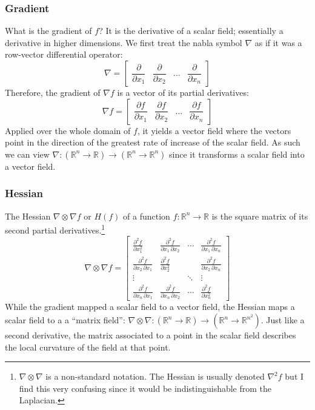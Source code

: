 \documentclass{article}
\begin{document}
\subsubsection{Gradient}
What is the gradient of $f$? It is the derivative of a scalar field; essentially
a derivative in higher dimensions. We first treat the nabla symbol $\nabla$ as
if it was a row-vector differential operator: 
\[
\nabla = 
\begin{bmatrix}
    \dfrac{\partial }{\partial x_1} &
    \dfrac{\partial }{\partial x_2} &
    \hdots &
    \dfrac{\partial }{\partial x_n}
\end{bmatrix}
\]
Therefore, the gradient of $\nabla f$ is a vector of its partial derivatives:
\[
\nabla f = 
\begin{bmatrix}
    \dfrac{\partial f}{\partial x_1} &
    \dfrac{\partial f}{\partial x_2} &
    \hdots &
    \dfrac{\partial f}{\partial x_n}
\end{bmatrix}
\]
Applied over the whole domain of $f$, it yields a vector field where the vectors
point in the direction of the greatest rate of increase of the scalar field. As
such we can view $\nabla : (\mathbb{R}^n \rightarrow \mathbb{R})
\longrightarrow (\mathbb{R}^n \rightarrow \mathbb{R}^n) $ since it transforms a
scalar field into a vector field.
\subsubsection{Hessian}

The Hessian $\nabla \otimes \nabla f$ or
$H(f)$ of a function $ f: \mathbb{R}^n \longrightarrow \mathbb{R} $ is the
square matrix of its second partial derivatives.\footnote{$\nabla \otimes \nabla$ is a non-standard notation. The Hessian is usually denoted $\nabla^2 f$ but I find this
very confusing since it would be indistinguishable from the Laplacian.}
\[
    \nabla \otimes \nabla f =
    \begin{bmatrix}
        \frac{\partial^2 f}{\partial x_1^2} &
        \frac{\partial^2 f}{\partial x_1\,\partial x_2} &
        \cdots & \frac{\partial^2 f}{\partial x_1\,\partial x_n} \\ 
        \frac{\partial^2 f}{\partial x_2\,\partial x_1}
        & \frac{\partial^2 f}{\partial x_2^2} &  &
        \frac{\partial^2 f}{\partial x_2\,\partial x_n} \\ 
        \vdots &   & \ddots & \vdots \\ 
        \frac{\partial^2 f}{\partial x_n\,\partial x_1}
        & \frac{\partial^2 f}{\partial x_n\,\partial x_2} &
        \cdots & \frac{\partial^2 f}{\partial x_n^2}
    \end{bmatrix}
\]
While the gradient mapped a scalar field to a vector field, the Hessian maps a
scalar field to a a ``matrix field'': $\nabla \otimes \nabla : (\mathbb{R}^n
\rightarrow \mathbb{R}) \longrightarrow (\mathbb{R}^n \rightarrow
\mathbb{R}^{n^2})$. Just like a second derivative, the matrix associated to a
point in the scalar field describes the local curvature of the field at that
point.
\end{document}
